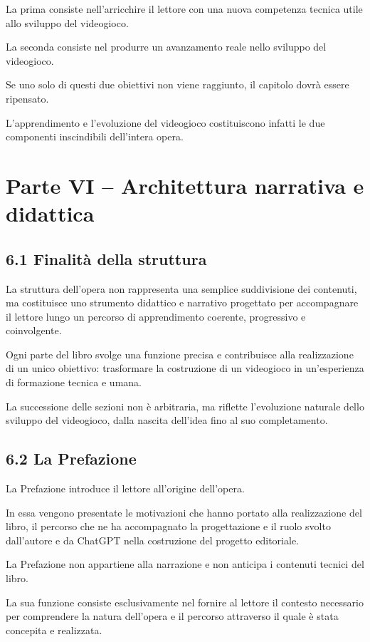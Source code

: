\documentclass{article}
\begin{document}
La prima consiste nell'arricchire il lettore con una nuova competenza tecnica utile allo sviluppo del videogioco.

La seconda consiste nel produrre un avanzamento reale nello sviluppo del videogioco.

Se uno solo di questi due obiettivi non viene raggiunto, il capitolo dovrà essere ripensato.

L'apprendimento e l'evoluzione del videogioco costituiscono infatti le due componenti inscindibili dell'intera opera.

\section{Parte VI – Architettura narrativa e didattica}
\subsection{6.1 Finalità della struttura}
La struttura dell'opera non rappresenta una semplice suddivisione dei contenuti, ma costituisce uno strumento didattico
e narrativo progettato per accompagnare il lettore lungo un percorso di apprendimento coerente, progressivo e
coinvolgente.

Ogni parte del libro svolge una funzione precisa e contribuisce alla realizzazione di un unico obiettivo: trasformare la
costruzione di un videogioco in un'esperienza di formazione tecnica e umana.

La successione delle sezioni non è arbitraria, ma riflette l'evoluzione naturale dello sviluppo del videogioco, dalla
nascita dell'idea fino al suo completamento.

\subsection{6.2 La Prefazione}
La Prefazione introduce il lettore all'origine dell'opera.

In essa vengono presentate le motivazioni che hanno portato alla realizzazione del libro, il percorso che ne ha
accompagnato la progettazione e il ruolo svolto dall'autore e da ChatGPT nella costruzione del progetto editoriale.

La Prefazione non appartiene alla narrazione e non anticipa i contenuti tecnici del libro.

La sua funzione consiste esclusivamente nel fornire al lettore il contesto necessario per comprendere la natura
dell'opera e il percorso attraverso il quale è stata concepita e realizzata.
\end{document}
